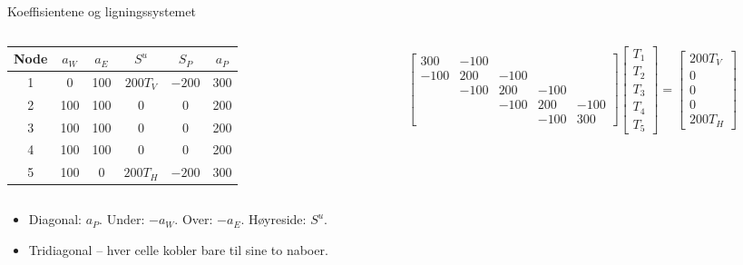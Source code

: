 \documentclass[11pt,aspectratio=169]{beamer}
\begin{document}
\begin{frame}{Koeffisientene og ligningssystemet}
\begin{columns}[c]
\begin{column}{0.44\textwidth}
\centering\footnotesize
\begin{tabular}{cccccc}
\toprule
Node & $a_W$ & $a_E$ & $S^u$ & $S_P$ & $a_P$ \\
\midrule
1 & 0 & 100 & $200T_V$ & $-200$ & 300 \\
2 & 100 & 100 & 0 & 0 & 200 \\
3 & 100 & 100 & 0 & 0 & 200 \\
4 & 100 & 100 & 0 & 0 & 200 \\
5 & 100 & 0 & $200T_H$ & $-200$ & 300 \\
\bottomrule
\end{tabular}
\end{column}
\begin{column}{0.54\textwidth}
\footnotesize
\setlength{\arraycolsep}{3pt}
\[
\begin{bmatrix}
300 & -100 & & & \\
-100 & 200 & -100 & & \\
 & -100 & 200 & -100 & \\
 & & -100 & 200 & -100 \\
 & & & -100 & 300
\end{bmatrix}
\begin{bmatrix} T_1\\T_2\\T_3\\T_4\\T_5 \end{bmatrix}
=
\begin{bmatrix} 200T_V\\0\\0\\0\\200T_H \end{bmatrix}
\]
\end{column}
\end{columns}
\vspace{0.6em}
\begin{itemize}
\item Diagonal: $a_P$. Under: $-a_W$. Over: $-a_E$. Høyreside: $S^u$.
\item Tridiagonal -- hver celle kobler bare til sine to naboer.
\end{itemize}
\end{frame}
\end{document}

